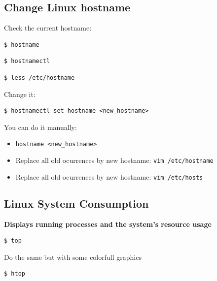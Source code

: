\documentclass{article}
\newenvironment{blocktemplate}[1]{%
    \tcolorbox[beamer,%
    noparskip,breakable,
    colframe=Blue,%
    colbacklower=LimeGreen!75!LightGreen,%
    title=#1]}%
    {\endtcolorbox}
\newenvironment{codetemplate}[1][]{%
  \mybasecolorbox[#1]
  \itshape
}{%
  \endmybasecolorbox
}
\begin{document}
\subsection{Change Linux hostname}
Check the current hostname:
\begin{codetemplate}{}
\begin{verbatim}
$ hostname
\end{verbatim}
\end{codetemplate}
\begin{codetemplate}{}
\begin{verbatim}
$ hostnamectl
\end{verbatim}
\end{codetemplate}
\begin{codetemplate}{}
\begin{verbatim}
$ less /etc/hostname
\end{verbatim}
\end{codetemplate}

Change it:
\begin{codetemplate}{}
\begin{verbatim}
$ hostnamectl set-hostname <new_hostname>
\end{verbatim}
\end{codetemplate}

\begin{blocktemplate}{NOTE}
You can do it manually:
\begin{itemize}
    \item \verb|hostname <new_hostname>|
    \item Replace all old ocurrences by new hostname: \verb|vim /etc/hostname|
    \item Replace all old ocurrences by new hostname: \verb|vim /etc/hosts|
\end{itemize}
\end{blocktemplate}

\subsection{Linux System Consumption}
\textbf{Displays running processes and the system’s resource usage}
\begin{codetemplate}{}
\begin{verbatim}
$ top
\end{verbatim}
\end{codetemplate}

Do the same but with some colorfull graphics
\begin{codetemplate}{}
\begin{verbatim}
$ htop
\end{verbatim}
\end{codetemplate}
\end{document}
